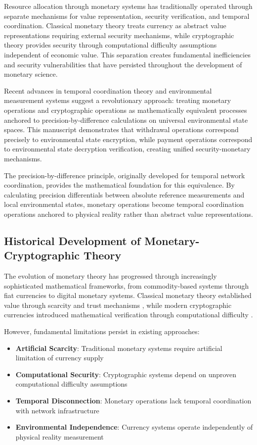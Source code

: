 \documentclass[12pt,a4paper]{article}
\begin{document}
Resource allocation through monetary systems has traditionally operated through separate mechanisms for value representation, security verification, and temporal coordination. Classical monetary theory treats currency as abstract value representations requiring external security mechanisms, while cryptographic theory provides security through computational difficulty assumptions independent of economic value. This separation creates fundamental inefficiencies and security vulnerabilities that have persisted throughout the development of monetary science.

Recent advances in temporal coordination theory and environmental measurement systems suggest a revolutionary approach: treating monetary operations and cryptographic operations as mathematically equivalent processes anchored to precision-by-difference calculations on universal environmental state spaces. This manuscript demonstrates that withdrawal operations correspond precisely to environmental state encryption, while payment operations correspond to environmental state decryption verification, creating unified security-monetary mechanisms.

The precision-by-difference principle, originally developed for temporal network coordination, provides the mathematical foundation for this equivalence. By calculating precision differentials between absolute reference measurements and local environmental states, monetary operations become temporal coordination operations anchored to physical reality rather than abstract value representations.

\subsection{Historical Development of Monetary-Cryptographic Theory}

The evolution of monetary theory has progressed through increasingly sophisticated mathematical frameworks, from commodity-based systems through fiat currencies to digital monetary systems. Classical monetary theory established value through scarcity and trust mechanisms \cite{menger1871,mises1912}, while modern cryptographic currencies introduced mathematical verification through computational difficulty \cite{chaum1983,nakamoto2008}.

However, fundamental limitations persist in existing approaches:

\begin{itemize}
\item \textbf{Artificial Scarcity}: Traditional monetary systems require artificial limitation of currency supply
\item \textbf{Computational Security}: Cryptographic systems depend on unproven computational difficulty assumptions
\item \textbf{Temporal Disconnection}: Monetary operations lack temporal coordination with network infrastructure
\item \textbf{Environmental Independence}: Currency systems operate independently of physical reality measurement
\end{itemize}
\end{document}
